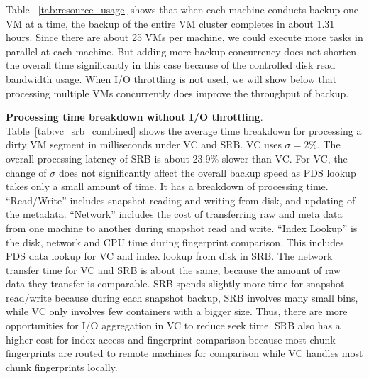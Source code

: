 Table ~\ref{tab:resource_usage} shows that when  each machine conducts
backup one VM at a time, the backup of the entire
VM cluster completes in about 1.31 hours. Since there are about 25 VMs per machine, we could execute
more tasks in parallel at each machine. But adding more backup concurrency does 
not shorten the overall time
significantly in this case because of the controlled  disk read bandwidth usage.
When I/O throttling is not used, we will show below that processing multiple VMs concurrently 
does improve the throughput of backup.


 

{\bf Processing time breakdown without I/O throttling}.
Table~\ref{tab:vc_srb_combined} shows
the  average  time breakdown for processing a dirty VM segment in milliseconds
under VC and SRB.
VC uses $\sigma=2\%$. 
The overall processing latency of SRB is about 23.9\% slower than VC.
For VC, the change of $\sigma$ does not significantly affect the overall backup speed as
PDS lookup takes only a small amount of time. 
It has a breakdown of processing time.
``Read/Write'' includes snapshot reading and writing from disk, and 
updating of the metadata.
``Network'' includes the cost of transferring raw and meta data from one machine to another during 
snapshot read and write.
``Index Lookup'' is the disk, network and CPU time during fingerprint comparison.
This includes PDS data lookup for VC and index lookup from disk in SRB. 
The network transfer time for VC and SRB is about the same, because the 
amount of raw data they transfer is comparable.
SRB spends slightly more time for snapshot read/write because during each snapshot  backup, SRB involves many small bins,
 while VC only involves few containers with a bigger size. Thus, there are more opportunities for I/O aggregation in VC to reduce seek time.
SRB also has a higher cost for index access and fingerprint comparison because most chunk fingerprints are routed
to remote machines for comparison while   VC handles most chunk fingerprints locally. 

